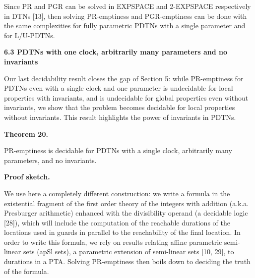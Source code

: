  
 
Since PR and PGR can be solved in EXPSPACE and 2-EXPSPACE respectively in DTNs [13], then solving PR-emptiness and PGR-emptiness can be done with the same complexities for fully parametric PDTNs with a single parameter and for L/U-PDTNs.\par
 
 
 
 
 
\par\medskip\noindent\textbf{6.3 PDTNs with one clock, arbitrarily many parameters and no invariants}\par
 
 
Our last decidability result closes the gap of Section 5: while PR-emptiness for PDTNs even with a single clock and one parameter is undecidable for local properties with invariants, and is undecidable for global properties even without invariants, we show that the problem becomes decidable for local properties without invariants. This result highlights the power of invariants in PDTNs.\par
 
 
 
\par\medskip\noindent\textbf{Theorem 20.}\par
 
 
PR-emptiness is decidable for PDTNs with a single clock, arbitrarily many parameters, and no invariants.\par
 
 
 
 
\par\medskip\noindent\textbf{Proof sketch.}\par
 
 
We use here a completely different construction: we write a formula in the existential fragment of the first order theory of the integers with addition (a.k.a. Presburger arithmetic) enhanced with the divisibility operand (a decidable logic [28]), which will include the computation of the reachable durations of the locations used in guards in parallel to the reachability of the final location. In order to write this formula, we rely on results relating affine parametric semi-linear sets (apSl sets), a parametric extension of semi-linear sets [10, 29], to durations in a PTA. Solving PR-emptiness then boils down to deciding the truth of the formula.\par
 
